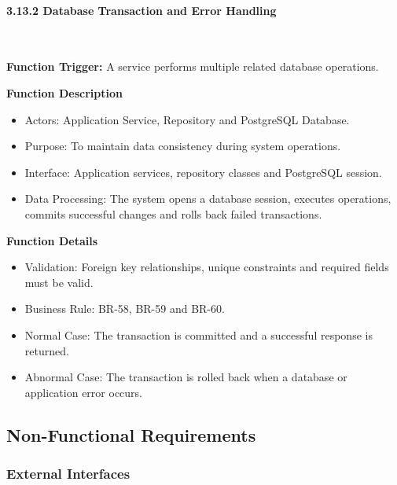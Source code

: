 \paragraph*{3.13.2 Database Transaction and Error Handling}\leavevmode\\[-0.5em]
\label{par:database-transaction-error-handling}

\textbf{Function Trigger:} A service performs multiple related database operations.

\textbf{Function Description}
\begin{itemize}[leftmargin=1.5em, nosep]
    \item Actors: Application Service, Repository and PostgreSQL Database.
    \item Purpose: To maintain data consistency during system operations.
    \item Interface: Application services, repository classes and PostgreSQL session.
    \item Data Processing: The system opens a database session, executes operations, commits successful changes and rolls back failed transactions.
\end{itemize}

\textbf{Function Details}
\begin{itemize}[leftmargin=1.5em, nosep]
    \item Validation: Foreign key relationships, unique constraints and required fields must be valid.
    \item Business Rule: BR-58, BR-59 and BR-60.
    \item Normal Case: The transaction is committed and a successful response is returned.
    \item Abnormal Case: The transaction is rolled back when a database or application error occurs.
\end{itemize}

\subsection{Non-Functional Requirements}
\label{subsec:non-functional-requirements}

\subsubsection{External Interfaces}
\label{subsubsec:external-interfaces}

